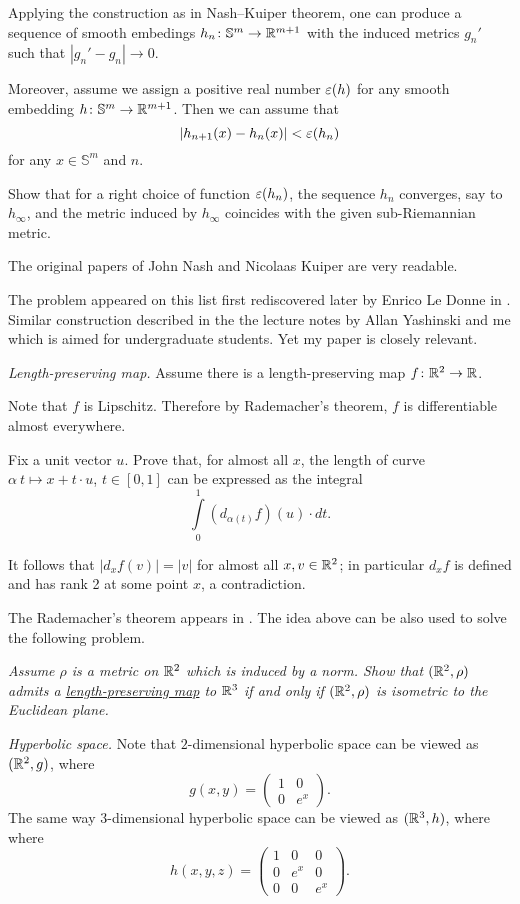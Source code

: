 Applying the construction as in Nash--Kuiper theorem,
one can produce a sequence of smooth embedings $h_n\colon\mathbb{S}^m\to \mathbb{R}^{m+1}$ with the induced metrics $g_n'$
such that $|g_n'-g_n|\to 0$.

Moreover, assume we assign a positive real number $\varepsilon(h)$ for any smooth embedding $h\colon\mathbb{S}^m\to\mathbb{R}^{m+1}$.
Then we can assume that 
\[|h_{n+1}(x)-h_n(x)|<\varepsilon(h_n)\] for any $x\in \mathbb{S}^m$ and $n$.

Show that for a right choice of function $\varepsilon(h_n)$,
the sequence $h_n$ converges, say to $h_\infty$, 
and the metric induced by $h_\infty$ coincides with the given sub-Riemannian metric.

The original papers of John Nash \cite{nash} 
and Nicolaas Kuiper \cite{kuiper} are very readable.

The problem appeared 
on this list first rediscovered later by Enrico Le Donne in \cite{le-donne}.
Similar construction described in the the lecture notes by Allan Yashinski and me \cite{petrunin-yashinsky} 
which is aimed for undergraduate students. 
Yet my paper \cite{petrunin-paths} is closely relevant.

\textit{Length-preserving map.}
Assume there is a length-preserving map $f\colon\mathbb{R}^2\to \mathbb{R}$.

Note that $f$ is Lipschitz.
Therefore by Rademacher's theorem, $f$ is differentiable almost everywhere.

Fix a unit vector $u$.
Prove that, for almost all $x$, the length of curve 
$\alpha\:t\mapsto x+t\cdot u$, $t\in[0,1]$ can be expressed as the integral
\[\int\limits_0^1 (d_{\alpha(t)}f)(u) \cdot dt.\]

It follows that $|d_xf(v)|=|v|$ for almost all $x,v\in\mathbb{R}^2$;
in particular $d_xf$ is defined and has rank 2 at some point $x$, a contradiction.  

 The Rademacher's theorem appears in \cite{rademacher}.
The idea above can be also used to solve the following problem.

{\it Assume $\rho$ is a metric on $\mathbb{R}^2$ 
which is induced by a norm.
Show that $(\mathbb{R}^2,\rho)$ admits 
a \hyperref[Length-preserving map]{\emph{length-preserving map}} 
to $\mathbb{R}^3$ 
if and only if 
$(\mathbb{R}^2,\rho)$ is isometric to the Euclidean plane.}



\textit{Hyperbolic space.}
Note that $2$-dimensional hyperbolic space 
can be viewed as $(\mathbb{R}^2,g)$, where 
\[g(x,y)=\left(\begin{matrix}
     1&0
     \\
     0&e^{x}
    \end{matrix}\right).\]
The same way $3$-dimensional hyperbolic space 
can be viewed as $(\mathbb{R}^3,h)$, where 
where 
\[h(x,y,z)=\left(\begin{matrix}
     1&0&0
     \\
     0&e^{x}&0
     \\
     0&0&e^{x}
    \end{matrix}\right).\]

